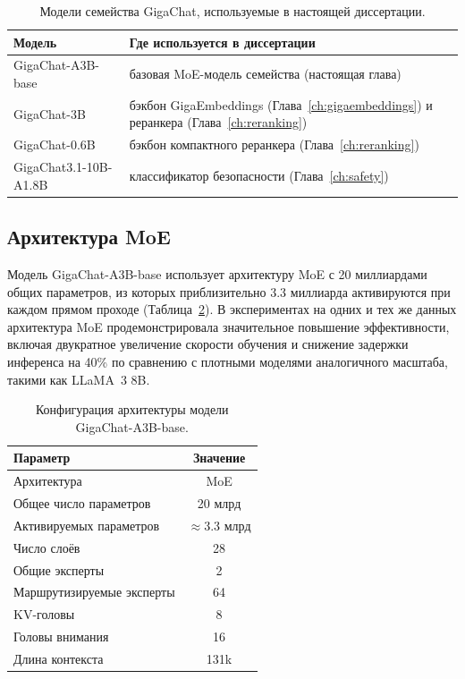 \begin{table}[H]
    \centering
    \caption{Модели семейства GigaChat, используемые в настоящей диссертации.}
    \label{tab:gc_usage}
    \begin{tabular}{p{}p{}}
        \toprule
        Модель & Где используется в диссертации \\
        \midrule
        GigaChat-A3B-base       & базовая MoE-модель семейства (настоящая глава) \\
        GigaChat-3B             & бэкбон GigaEmbeddings (Глава~\ref{ch:gigaembeddings}) и реранкера (Глава~\ref{ch:reranking}) \\
        GigaChat-0.6B           & бэкбон компактного реранкера (Глава~\ref{ch:reranking}) \\
        GigaChat3.1-10B-A1.8B   & классификатор безопасности (Глава~\ref{ch:safety}) \\
        \bottomrule
    \end{tabular}
\end{table}

\subsection{Архитектура MoE}\label{subsec:gc_moe}

Модель GigaChat-A3B-base использует архитектуру MoE с 20 миллиардами общих параметров, из которых приблизительно 3.3 миллиарда активируются при каждом прямом проходе (Таблица~\ref{tab:gc_arch}). В экспериментах на одних и тех же данных архитектура MoE продемонстрировала значительное повышение эффективности, включая двукратное увеличение скорости обучения и снижение задержки инференса на 40\% по сравнению с плотными моделями аналогичного масштаба, такими как LLaMA~3 8B.

\begin{table}[H]
    \centering
    \caption{Конфигурация архитектуры модели GigaChat-A3B-base.}
    \label{tab:gc_arch}
    \begin{tabular}{lc}
        \toprule
        Параметр & Значение \\
        \midrule
        Архитектура                    & MoE \\
        Общее число параметров         & 20 млрд \\
        Активируемых параметров        & $\approx$3.3 млрд \\
        Число слоёв                    & 28 \\
        Общие эксперты                 & 2 \\
        Маршрутизируемые эксперты      & 64 \\
        KV-головы                      & 8 \\
        Головы внимания                & 16 \\
        Длина контекста                & 131k \\
        \bottomrule
    \end{tabular}
\end{table}

